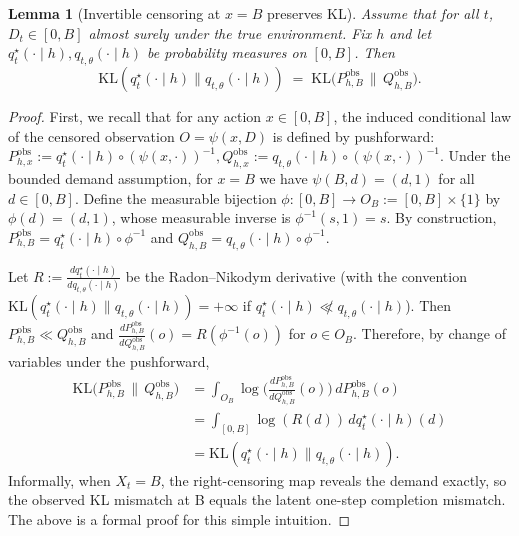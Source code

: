 \documentclass[11pt]{article}
\newtheorem{lemma}{Lemma}
\begin{document}
\begin{lemma}[Invertible censoring at $x=B$ preserves KL]\label{lem:invertible-B-preserves-KL}
Assume that for all $t$, $D_t\in[0,B]$ almost surely under the true environment. Fix $h$ and let $q_t^\star(\cdot\mid h),q_{t,\theta}(\cdot\mid h)$ be probability measures on $[0,B]$.
Then
\[
\mathrm{KL}(q_t^\star(\cdot\mid h)\|q_{t,\theta}(\cdot\mid h)) \;=\; \mathrm{KL}\big(P^{\mathrm{obs}}_{h,B}\,\|\,Q^{\mathrm{obs}}_{h,B}\big).
\]
\end{lemma}

\begin{proof}
First, we recall that for any action $x\in[0,B]$, the induced conditional law of the censored observation $O=\psi(x,D)$ is defined by pushforward:
\(
P^{\mathrm{obs}}_{h,x} := q_t^\star(\cdot\mid h) \circ (\psi(x,\cdot))^{-1},
Q^{\mathrm{obs}}_{h,x} := q_{t,\theta}(\cdot\mid h) \circ (\psi(x,\cdot))^{-1}
\). Under the bounded demand assumption, for $x=B$ we have $\psi(B,d)=(d,1)$ for all $d\in[0,B]$.
Define the measurable bijection $\phi:[0,B]\to O_B:= [0,B]\times\{1\}$ by $\phi(d)=(d,1)$, whose measurable inverse is
$\phi^{-1}(s,1)=s$.
By construction, $P^{\mathrm{obs}}_{h,B}=q_t^\star(\cdot\mid h)\circ\phi^{-1}$ and $Q^{\mathrm{obs}}_{h,B}=q_{t,\theta}(\cdot\mid h)\circ\phi^{-1}$.

Let $R := \frac{dq_t^\star(\cdot\mid h)}{dq_{t,\theta}(\cdot\mid h)}$ be the Radon--Nikodym derivative (with the convention $\mathrm{KL}(q_t^\star(\cdot\mid h)\|q_{t,\theta}(\cdot\mid h))=+\infty$ if $q_t^\star(\cdot\mid h)\not\ll q_{t,\theta}(\cdot\mid h)$).
Then $P^{\mathrm{obs}}_{h,B}\ll Q^{\mathrm{obs}}_{h,B}$ and
\(
\frac{dP^{\mathrm{obs}}_{h,B}}{dQ^{\mathrm{obs}}_{h,B}}(o) = R(\phi^{-1}(o))
\)
for $o\in O_B$. Therefore, by change of variables under the pushforward,
\begin{align*}
\mathrm{KL}\big(P^{\mathrm{obs}}_{h,B}\,\|\,Q^{\mathrm{obs}}_{h,B}\big)
&= \int_{O_B} \log\!\Big(\frac{dP^{\mathrm{obs}}_{h,B}}{dQ^{\mathrm{obs}}_{h,B}}(o)\Big)\, dP^{\mathrm{obs}}_{h,B}(o)\\
&= \int_{[0,B]} \log(R(d))\, dq_t^\star(\cdot\mid h)(d)\\
&= \mathrm{KL}(q_t^\star(\cdot\mid h)\|q_{t,\theta}(\cdot\mid h)).  
\end{align*}
Informally, when $X_t = B$, the right-censoring map reveals the demand exactly, so the observed KL mismatch at B equals the latent one-step completion mismatch. The above is a formal proof for this simple intuition.
\end{proof}
\end{document}
